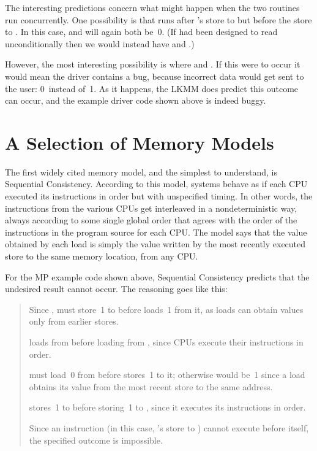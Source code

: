 The interesting predictions concern what might happen when the two
routines run concurrently.
One possibility is that  runs after 's store to 
but before the store to .
In this case,  and  will again both be~0.
(If  had been designed to read  unconditionally then we
would instead have  and .)

However, the most interesting possibility is where  and
.
If this were to occur it would mean the driver contains a bug, because
incorrect data would get sent to the user:
0~instead of~1.
As it happens, the LKMM does predict this outcome can occur, and the example
driver code shown above is indeed buggy.


\section{A Selection of Memory Models}

The first widely cited memory model, and the simplest to understand,
is Sequential Consistency.
According to this model, systems behave as if each CPU executed its
instructions in order but with unspecified timing.
In other words, the instructions from the various CPUs get interleaved
in a nondeterministic way, always according to some single global order
that agrees with the order of the instructions in the program source for
each CPU\@.
The model says that the value obtained by each load is simply the value
written by the most recently executed store to the same memory location,
from any CPU\@.

For the MP example code shown above, Sequential Consistency predicts
that the undesired result  cannot occur.
The reasoning goes like this:

\begin{quote}
  Since ,  must store~1 to  before 
  loads~1 from it, as loads can obtain values only from earlier stores.

   loads from  before loading from , since CPUs
  execute their instructions in order.

   must load~0 from  before  stores~1 to it;
  otherwise  would be~1 since a load obtains its value from the
  most recent store to the same address.

   stores~1 to  before storing~1 to , since it
  executes its instructions in order.

  Since an instruction (in this case, 's store to )
  cannot execute before itself, the specified outcome is impossible.
\end{quote}

